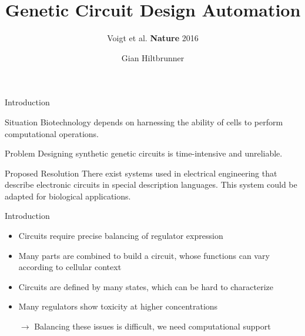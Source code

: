 \documentclass[10pt]{beamer}
\title{Genetic Circuit Design Automation}
\subtitle{Voigt et al. \textbf{Nature} 2016}
\date{}
\author{Gian Hiltbrunner}
\institute{CBB Seminar, ETH Zurich}
\begin{document}
\maketitle


\begin{frame}[fragile]{Introduction}

    {
      \begin{block}{Situation}
        Biotechnology depends on harnessing the ability of cells to perform computational operations. 
      \end{block}
      \begin{alertblock}{Problem}
        Designing synthetic genetic circuits is time-intensive and unreliable. 
      \end{alertblock}
      \begin{exampleblock}{Proposed Resolution}
        There exist systems used in electrical engineering that describe electronic circuits in special description languages. This system could be adapted for biological applications.
      \end{exampleblock}}
      
\end{frame}

\begin{frame}{Introduction}
  \begin{itemize}[<+- | alert@+>]
    \item Circuits require precise balancing of regulator expression
    \item Many parts are combined to build a circuit, whose functions can vary according to cellular context
    \item Circuits are defined by many states, which can be hard to characterize
    \item Many regulators show toxicity at higher concentrations
    \item[$\rightarrow$] Balancing these issues is difficult, we need computational support
  \end{itemize}
\end{frame}
\end{document}
